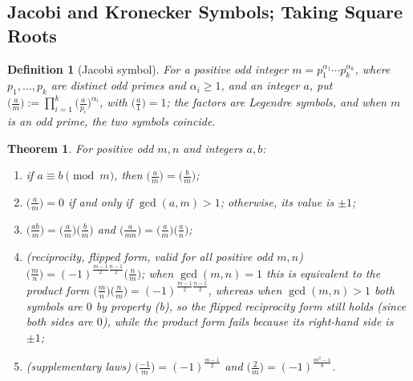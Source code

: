 \documentclass[11pt]{article}
\theoremstyle{ntstyle}
\newtheorem{theorem}{Theorem}[subsection]
\newtheorem{definition}{Definition}[subsection]
\newcommand{\legs}[2]{\bigl(\tfrac{#1}{#2}\bigr)}
\begin{document}
\subsection{Jacobi and Kronecker Symbols; Taking Square Roots}

\begin{definition}[Jacobi symbol]\label{def:7.6.1} For a positive
	odd integer $m = p_1^{\alpha_1} \cdots p_k^{\alpha_k}$, where $p_1,\ldots,p_k$ are distinct odd
	primes and $\alpha_i\ge1$, and an integer
	$a$, put $\legs{a}{m} := \prod_{i=1}^{k}\legs{a}{p_i}^{\alpha_i}$, with $\legs{a}{1} = 1$; the
	factors are Legendre symbols, and when $m$ is an odd prime, the two symbols coincide.
\end{definition}
\begin{theorem}\label{thm:7.6.1}
	For positive odd $m, n$ and integers $a, b$:

	\begin{enumerate}[label={\alph*)}]
		\item if $a \equiv b \pmod{m}$, then $\legs{a}{m} =
						\legs{b}{m}$;
		\item $\legs{a}{m} = 0$ if and only if $\gcd(a, m) > 1$; otherwise, its value is $\pm 1$;
		\item $\legs{ab}{m} = \legs{a}{m}\legs{b}{m}$ and $\legs{a}{mn} = \legs{a}{m}\legs{a}{n}$;
		\item (reciprocity, flipped form, valid for all positive odd $m, n$)
					$\legs{m}{n} = (-1)^{\frac{m-1}{2}\frac{n-1}{2}}\legs{n}{m}$; when
					$\gcd(m, n) = 1$ this is equivalent to the product form
					$\legs{m}{n}\legs{n}{m} = (-1)^{\frac{m-1}{2}\frac{n-1}{2}}$, whereas
					when $\gcd(m, n) > 1$ both symbols are $0$ by property (b), so the flipped reciprocity form
					still holds (since both sides are $0$), while the product form fails because its right-hand
					side is $\pm 1$;
		\item (supplementary laws) $\legs{-1}{m} =
						(-1)^{\frac{m-1}{2}}$ and $\legs{2}{m} = (-1)^{\frac{m^2-1}{8}}$.
	\end{enumerate}
\end{theorem}
\end{document}

